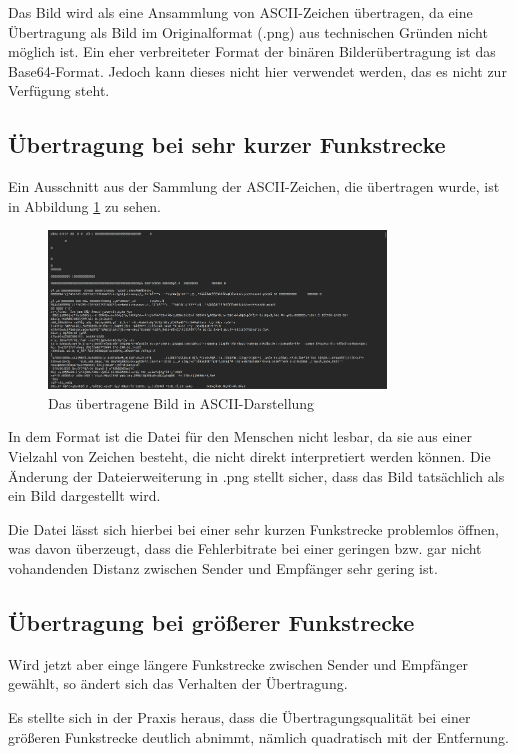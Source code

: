Das Bild wird als eine Ansammlung von ASCII-Zeichen übertragen, da eine Übertragung als Bild im Originalformat (.png) aus technischen Gründen nicht möglich ist.
Ein eher verbreiteter Format der binären Bilderübertragung ist das Base64-Format. Jedoch kann dieses nicht hier verwendet werden, das es nicht zur Verfügung steht.

\subsection{Übertragung bei sehr kurzer Funkstrecke}
Ein Ausschnitt aus der Sammlung der ASCII-Zeichen, die übertragen wurde, ist in Abbildung \ref{fig:Task2c} zu sehen.

\begin{figure}[H]
    \centering
    \includegraphics[width=0.8\textwidth]{Pictures/memeASCII.png}
    \caption{Das übertragene Bild in ASCII-Darstellung}
    \label{fig:Task2c}
\end{figure}

In dem Format ist die Datei für den Menschen nicht lesbar, da sie aus einer Vielzahl von Zeichen besteht, die nicht direkt interpretiert werden können. 
Die Änderung der Dateierweiterung in .png stellt sicher, dass das Bild tatsächlich als ein Bild dargestellt wird. 

Die Datei lässt sich hierbei bei einer sehr kurzen Funkstrecke problemlos öffnen, was davon überzeugt, dass die Fehlerbitrate bei einer geringen bzw. gar nicht vohandenden Distanz zwischen Sender und Empfänger sehr gering ist.

\subsection{Übertragung bei größerer Funkstrecke}
Wird jetzt aber einge längere Funkstrecke zwischen Sender und Empfänger gewählt, so ändert sich das Verhalten der Übertragung. 

Es stellte sich in der Praxis heraus, dass die Übertragungsqualität bei einer größeren Funkstrecke deutlich abnimmt, nämlich quadratisch mit der Entfernung.

